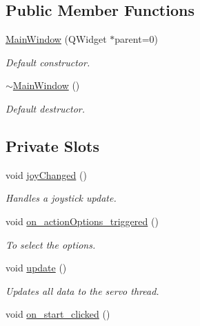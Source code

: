 \subsection*{Public Member Functions}
\begin{DoxyCompactItemize}
\item 
\hyperlink{a00004_a8b244be8b7b7db1b08de2a2acb9409db}{Main\+Window} (Q\+Widget $\ast$parent=0)
\begin{DoxyCompactList}\small\item\em Default constructor. \end{DoxyCompactList}\item 
\hyperlink{a00004_ae98d00a93bc118200eeef9f9bba1dba7}{$\sim$\+Main\+Window} ()
\begin{DoxyCompactList}\small\item\em Default destructor. \end{DoxyCompactList}\end{DoxyCompactItemize}
\subsection*{Private Slots}
\begin{DoxyCompactItemize}
\item 
void \hyperlink{a00004_abb4c2d8a79c9f80010ea031366bf8226}{joy\+Changed} ()
\begin{DoxyCompactList}\small\item\em Handles a joystick update. \end{DoxyCompactList}\item 
void \hyperlink{a00004_a1dd57ccb62bc6f5a361aba6e088dd2e1}{on\+\_\+action\+Options\+\_\+triggered} ()
\begin{DoxyCompactList}\small\item\em To select the options. \end{DoxyCompactList}\item 
void \hyperlink{a00004_a128f71880d4b9683149023fc46fcc9f8}{update} ()
\begin{DoxyCompactList}\small\item\em Updates all data to the servo thread. \end{DoxyCompactList}\item 
void \hyperlink{a00004_ae66e9ab15f911b93fce0f161d2fde880}{on\+\_\+start\+\_\+clicked} ()
\end{DoxyCompactItemize}
